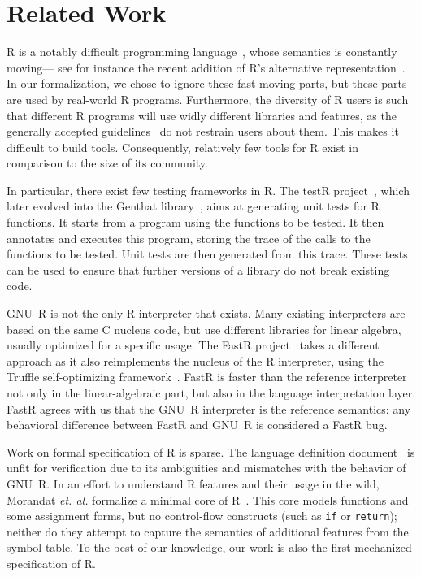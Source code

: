 \documentclass[
    sigplan,
    10pt,
    review, %
    natbib=false %
 ]{acmart}
\newcommand\newtext[1]{{\color{blue} #1}}
\begin{document}
\section{Related Work}
\label{sec:related:work}

R is a notably difficult programming language~\parencite{RInferno},
whose semantics is constantly moving---%
see for instance the recent addition
of R's alternative representation~\parencite{altrepR}.
In our formalization, we chose to ignore these fast moving parts,
but these parts are used by real-world R programs.
Furthermore, the diversity of R users is such that different R programs
will use widly different libraries and features,
as the generally accepted guidelines~\parencite{RGuidelines}
do not restrain users about them.
This makes it difficult to build tools.
Consequently, relatively few tools for R exist
in comparison to the size of its community.

In particular,
there exist few testing frameworks in R.
The testR project~\parencite{maj2013testr, 2014testr},
which later evolved into the Genthat library~\parencite{genthat},
aims at generating unit tests for R functions.
It starts from a program using the functions to be tested.
It then annotates and executes this program,
storing the trace of the calls to the functions to be tested.
Unit tests are then generated from this trace.
These tests can be used
to ensure that further versions of a library
do not break existing code.

GNU~R is not the only R interpreter that exists.
Many existing interpreters are based on the same C nucleus code,
but use different libraries for linear algebra,
usually optimized for a specific usage.
%
The FastR project~\parencite{kalibera2014fast} takes a different approach
as it also reimplements the nucleus of the R interpreter, using the Truffle self-optimizing framework~\parencite{wuerthingertruffle}.
FastR is faster than the reference interpreter not only in the linear-algebraic part, but also in the language interpretation layer.
%
FastR agrees with us that the GNU~R interpreter is the reference semantics: any behavioral difference between FastR and GNU~R is considered a FastR bug.

\newtext{
Work on formal specification of R is sparse.
%
The language definition document~\parencite{team2000r}
is unfit for verification due to its ambiguities and mismatches with the behavior of GNU~R.
%
In an effort to understand R features and their usage in the wild, Morandat \emph{et. al.} formalize a minimal core of R~\parencite{morandat2012evaluating}.
This core models functions and some assignment forms, but no control-flow constructs (such as \texttt{if} or \texttt{return}); %
neither do they attempt to capture the semantics of additional features from the symbol table.
}
%
To the best of our knowledge, our work is also the first mechanized specification of R.
\end{document}
